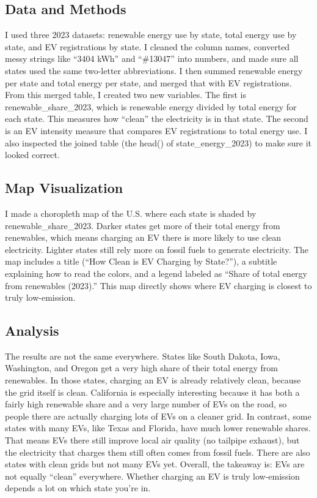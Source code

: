 \documentclass[
  letterpaper,
  DIV=11,
  numbers=noendperiod]{scrartcl}
\begin{document}
\subsection{Data and Methods}\label{data-and-methods}

I used three 2023 datasets: renewable energy use by state, total energy
use by state, and EV registrations by state. I cleaned the column names,
converted messy strings like ``3404 kWh'' and ``\#13047'' into numbers,
and made sure all states used the same two-letter abbreviations. I then
summed renewable energy per state and total energy per state, and merged
that with EV registrations. From this merged table, I created two new
variables. The first is renewable\_share\_2023, which is renewable
energy divided by total energy for each state. This measures how
``clean'' the electricity is in that state. The second is an EV
intensity measure that compares EV registrations to total energy use. I
also inspected the joined table (the head() of state\_energy\_2023) to
make sure it looked correct.

\subsection{Map Visualization}\label{map-visualization}

I made a choropleth map of the U.S. where each state is shaded by
renewable\_share\_2023. Darker states get more of their total energy
from renewables, which means charging an EV there is more likely to use
clean electricity. Lighter states still rely more on fossil fuels to
generate electricity. The map includes a title (``How Clean is EV
Charging by State?''), a subtitle explaining how to read the colors, and
a legend labeled as ``Share of total energy from renewables (2023).''
This map directly shows where EV charging is closest to truly
low-emission.

\subsection{Analysis}\label{analysis}

The results are not the same everywhere. States like South Dakota, Iowa,
Washington, and Oregon get a very high share of their total energy from
renewables. In those states, charging an EV is already relatively clean,
because the grid itself is clean. California is especially interesting
because it has both a fairly high renewable share and a very large
number of EVs on the road, so people there are actually charging lots of
EVs on a cleaner grid. In contrast, some states with many EVs, like
Texas and Florida, have much lower renewable shares. That means EVs
there still improve local air quality (no tailpipe exhaust), but the
electricity that charges them still often comes from fossil fuels. There
are also states with clean grids but not many EVs yet. Overall, the
takeaway is: EVs are not equally ``clean'' everywhere. Whether charging
an EV is truly low-emission depends a lot on which state you're in.
\end{document}
